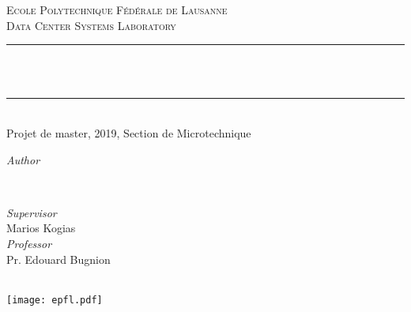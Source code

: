 \makeatletter
{}
\begin{titlepage}
	\newcommand{\HRule}{\rule{\linewidth}{0.5mm}}

	\center


	\textsc{\LARGE Ecole Polytechnique Fédérale de Lausanne}\\[1cm]

	\textsc{\Large Data Center Systems Laboratory}\\[0.5cm]


	\HRule\\[0.4cm]

	{\huge\bfseries \@title}\\[0.4cm]

    \HRule\\[0.4cm]
    {\large{}Projet de master, 2019, Section de Microtechnique}\\[1.5cm]


    \begin{minipage}[t]{0.4\textwidth}
		\begin{flushleft}
			\large
			\textit{Author}\\
			\@author
		\end{flushleft}
	\end{minipage}
	~
    \begin{minipage}[t]{0.4\textwidth}
		\begin{flushright}
			\large
			\textit{Supervisor}\\
			Marios Kogias\\
			\textit{Professor}\\
            Pr. Edouard Bugnion
		\end{flushright}
	\end{minipage}

    \vfill

    {\large\@date}\\

	\texttt{[image: epfl.pdf]}
\end{titlepage}
\restoregeometry
